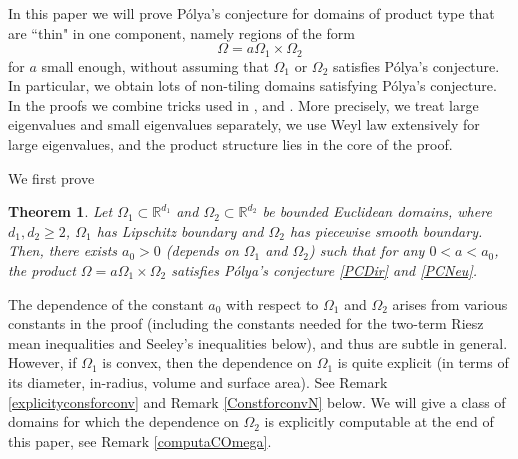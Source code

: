 \documentclass[11pt,letterpaper]{amsart}
\numberwithin{equation}{section}
\theoremstyle{plain}
\newtheorem{theorem}{Theorem}[section]
\theoremstyle{plain}
\numberwithin{equation}{section}
\theoremstyle{remark}
\begin{document}
	In this paper  
	we will prove P\'olya's conjecture for domains of product type that are ``thin" in one component, namely regions of the form   
	\[
	\Omega = a\Omega_1 \times \Omega_2  
	\]
	for $a$ small enough, without assuming that $\Omega_1$ or $\Omega_2$ satisfies P\'olya's conjecture. In particular, we obtain lots of non-tiling domains satisfying P\'olya's conjecture. In the proofs we combine tricks used in   \cite{FLPS}, \cite{AL} and \cite{P61}. More precisely, we treat large eigenvalues and small eigenvalues separately, we use Weyl law extensively for large eigenvalues, and the product structure lies in the core of the proof. 	
	
	We first prove	
	\begin{theorem}\label{mthm2}
		Let $\Omega_1 \subset \mathbb R^{d_1}$  and $\Omega_2\subset \mathbb R^{d_2}$ be   bounded Euclidean domains, where $d_1, d_2 \ge 2$, $\Omega_1$ has Lipschitz boundary and $\Omega_2$ has piecewise smooth boundary. Then, there exists $a_0> 0$ (depends on $\Omega_1$ and $\Omega_2$) such that for any $0< a< a_0$, the product $\Omega = a\Omega_1\times \Omega_2$ satisfies P\'olya's conjecture \eqref{PCDir} and \eqref{PCNeu}.
	\end{theorem}	 
	
	The dependence of the constant $a_0$ with respect to $\Omega_1$ and $\Omega_2$ arises from  various constants in the proof (including the constants needed for the  two-term Riesz mean inequalities and Seeley's inequalities below), and thus are subtle in general.  However, if $\Omega_1$ is convex, then the dependence on $\Omega_1$ is quite explicit (in terms of its diameter, in-radius, volume and  surface area). See Remark \ref{explicityconsforconv} and Remark \ref{ConstforconvN} below.  We will give a class of domains for which the dependence on $\Omega_2$ is explicitly computable at the end of this paper, see Remark \ref{computaCOmega}. 
	
\end{document}
